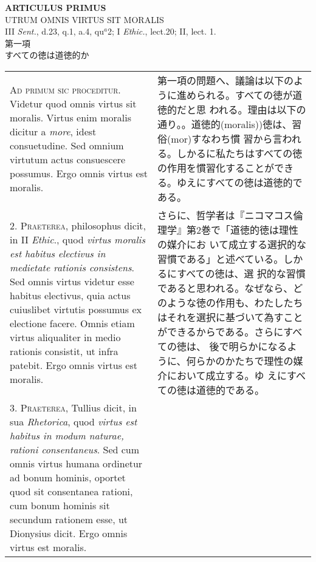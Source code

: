 \documentclass[10pt]{jsarticle}
\begin{document}
\begin{center}
{\Large {\bf ARTICULUS PRIMUS}}\\
{\large UTRUM OMNIS VIRTUS SIT MORALIS}\\
{\footnotesize III {\itshape Sent.}, d.23, q.1, a.4, qu$^{a}$2; I {\itshape Ethic.}, lect.20; II, lect. 1.}\\
{\Large 第一項\\すべての徳は道徳的か}
\end{center}

\begin{longtable}{p{21em}p{21em}}
{\scshape Ad primum sic proceditur}. Videtur quod omnis virtus sit
moralis. Virtus enim moralis dicitur a {\itshape more}, idest
consuetudine. Sed omnium virtutum actus consuescere possumus. Ergo
omnis virtus est moralis.

&

第一項の問題へ、議論は以下のように進められる。すべての徳が道徳的だと思
われる。理由は以下の通り。。道徳的(moralis))徳は、習俗(mor)すなわち慣
習から言われる。しかるに私たちはすべての徳の作用を慣習化することができ
る。ゆえにすべての徳は道徳的である。

\\

2. {\scshape Praeterea}, philosophus dicit, in II {\itshape Ethic}.,
quod {\itshape virtus moralis est habitus electivus in medietate rationis
consistens}. Sed omnis virtus videtur esse habitus electivus, quia
actus cuiuslibet virtutis possumus ex electione facere. Omnis etiam
virtus aliqualiter in medio rationis consistit, ut infra patebit. Ergo
omnis virtus est moralis.

&

さらに、哲学者は『ニコマコス倫理学』第2巻で「道徳的徳は理性の媒介にお
いて成立する選択的な習慣である」と述べている。しかるにすべての徳は、選
択的な習慣であると思われる。なぜなら、どのような徳の作用も、わたしたち
はそれを選択に基づいて為すことができるからである。さらにすべての徳は、
後で明らかになるように、何らかのかたちで理性の媒介において成立する。ゆ
えにすべての徳は道徳的である。

\\



3. {\scshape Praeterea}, Tullius dicit, in sua {\itshape Rhetorica},
quod {\itshape virtus est habitus in modum naturae, rationi
consentaneus}. Sed cum omnis virtus humana ordinetur ad bonum hominis,
oportet quod sit consentanea rationi, cum bonum hominis sit secundum
rationem esse, ut Dionysius dicit. Ergo omnis virtus est moralis.


\end{longtable}
\end{document}
